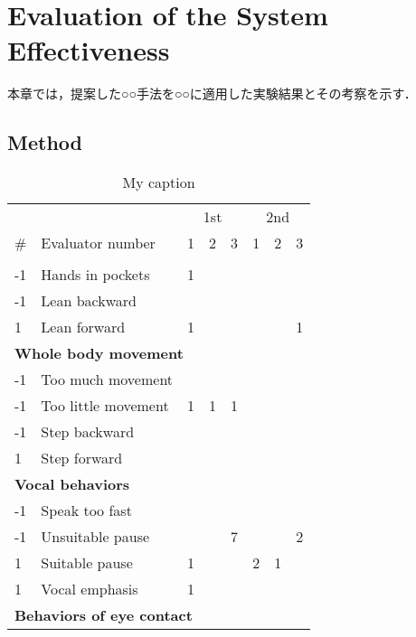 \chapter{Evaluation of the System Effectiveness}
本章では，提案した○○手法を○○に適用した実験結果とその考察を示す．

\section{Method}
\begin{table}[]
\centering
\caption{My caption}
\label{my-label}
\begin{tabular}{|l|l|l|l|l|l|l|l|}
\hline
 &  & \multicolumn{3}{c|}{1st} & \multicolumn{3}{c|}{2nd} \\ \cline{2-8} 
\multirow{-2}{*}{\#} & Evaluator number & 1 & 2 & 3 & 1 & 2 & 3 \\ \hline
\multicolumn{8}{|l|}{\cellcolor[HTML]{F2F2F2}{\color[HTML]{333333} \textbf{Postural behaviors}}} \\ \hline
-1 & Hands in pockets & 1 &  &  &  &  &  \\ \hline
-1 & Lean backward &  &  &  &  &  &  \\ \hline
1 & Lean forward & 1 &  &  &  &  & 1 \\ \hline
\multicolumn{8}{|l|}{\cellcolor[HTML]{F2F2F2}\textbf{Whole body movement}} \\ \hline
-1 & Too much movement &  &  &  &  &  &  \\ \hline
-1 & Too little movement & 1 & 1 & 1 &  &  &  \\ \hline
-1 & Step backward &  &  &  &  &  &  \\ \hline
1 & Step forward &  &  &  &  &  &  \\ \hline
\multicolumn{8}{|l|}{\cellcolor[HTML]{F2F2F2}\textbf{Vocal behaviors}} \\ \hline
-1 & Speak too fast &  &  &  &  &  &  \\ \hline
-1 & Unsuitable pause &  &  & 7 &  &  & 2 \\ \hline
1 & Suitable pause & 1 &  &  & 2 & 1 &  \\ \hline
1 & Vocal emphasis & 1 &  &  &  &  &  \\ \hline
\multicolumn{8}{|l|}{\cellcolor[HTML]{F2F2F2}\textbf{Behaviors of eye contact}} \\ \hline

\end{tabular}
\end{table}

